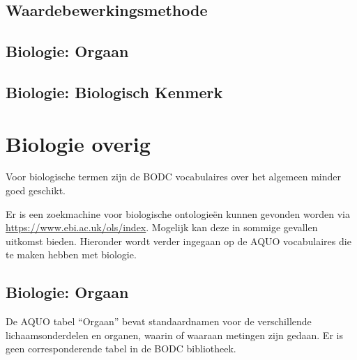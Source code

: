 \documentclass[
]{book}
\begin{document}
\hypertarget{waardebewerkingsmethode}{%
\section{Waardebewerkingsmethode}\label{waardebewerkingsmethode}}

\hypertarget{biologie-orgaan}{%
\section{Biologie: Orgaan}\label{biologie-orgaan}}

\hypertarget{biologie-biologisch-kenmerk}{%
\section{Biologie: Biologisch Kenmerk}\label{biologie-biologisch-kenmerk}}

\hypertarget{biologie-overig}{%
\chapter{Biologie overig}\label{biologie-overig}}

Voor biologische termen zijn de BODC vocabulaires over het algemeen minder goed geschikt.

Er is een zoekmachine voor biologische ontologieën kunnen gevonden worden via \url{https://www.ebi.ac.uk/ols/index}. Mogelijk kan deze in sommige gevallen uitkomst bieden. Hieronder wordt verder ingegaan op de AQUO vocabulaires die te maken hebben met biologie.

\hypertarget{biologie-orgaan-1}{%
\section{Biologie: Orgaan}\label{biologie-orgaan-1}}

De AQUO tabel ``Orgaan'' bevat standaardnamen voor de verschillende lichaamsonderdelen en organen, waarin of waaraan metingen zijn gedaan. Er is geen corresponderende tabel in de BODC bibliotheek.
\end{document}
